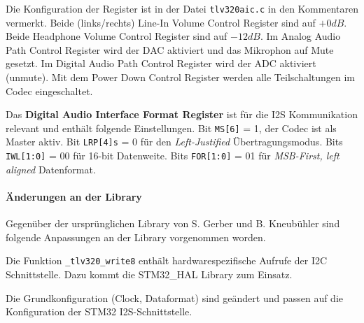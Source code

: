 Die Konfiguration der Register ist in der Datei \texttt{tlv320aic.c} in den Kommentaren vermerkt. Beide (links/rechts) Line-In Volume Control Register sind auf $+0\si{dB}$.
Beide Headphone Volume Control Register sind auf $-12\si{dB}$.
Im Analog Audio Path Control Register wird der DAC aktiviert und das Mikrophon auf Mute gesetzt.
Im Digital Audio Path Control Register wird der ADC aktiviert (unmute).
Mit dem Power Down Control Register werden alle Teilschaltungen im Codec eingeschaltet.

Das \textbf{Digital Audio Interface Format Register} ist für die I2S Kommunikation relevant und enthält folgende Einstellungen. Bit \texttt{MS[6]} = 1, der Codec ist als Master aktiv. Bit \texttt{LRP[4]s} = 0 für den \textit{Left-Justified} Übertragungsmodus.
Bits \texttt{IWL[1:0]} = 00 für 16-bit Datenweite.
Bits \texttt{FOR[1:0]} = 01 für \textit{MSB-First, left aligned} Datenformat.

\paragraph{Änderungen an der Library}

Gegenüber der ursprünglichen Library von S. Gerber und B. Kneubühler sind folgende Anpassungen an der Library vorgenommen worden.

Die Funktion \texttt{\_tlv320\_write8} enthält hardwarespezifische Aufrufe der I2C Schnittstelle. Dazu kommt die STM32\_HAL Library zum Einsatz.

Die Grundkonfiguration (Clock, Dataformat) sind geändert und passen auf die Konfiguration der STM32 I2S-Schnittstelle.


